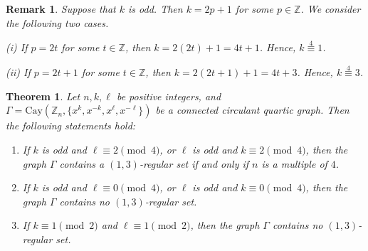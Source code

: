 \documentclass[12pt]{article}
\newtheorem{thmA}[propA]{Theorem}
\newtheorem{remA}[propA]{Remark}
\begin{document}
 \begin{remA}\label{rem:odd}
 	Suppose that $k$ is odd. Then $k=2p+1$ for some $p\in\mathbb{Z}$. We consider the following two cases.
 	
 	\textup{(i)} If $p=2t$ for some $t\in\mathbb{Z}$, then $k=2(2t)+1=4t+1$. Hence, $k\stackrel{4}{\equiv}1$.
 	
 	\textup{(ii)} If $p=2t+1$ for some $t\in\mathbb{Z}$, then $k=2(2t+1)+1=4t+3$. Hence, $k\stackrel{4}{\equiv}3$.
 \end{remA}
  \begin{thmA}\label{thm:13}
  	Let $n, k, \ell$ be positive integers, and $\Gamma = \mathrm{Cay}(\mathbb{Z}_n, \{x^k, x^{-k}, x^\ell, x^{-\ell}\})$ be a connected circulant quartic graph. Then the following statements hold:
  	\begin{enumerate}
  		\item[(i)] If $k$ is odd and \(\ell \equiv 2 \pmod{4}\), or $\ell$ is odd and \(k \equiv 2 \pmod{4}\), then the graph \(\Gamma\) contains a \((1,3)\)-regular set if and only if \(n\) is a multiple of \(4\).
  		\item[(ii)] If $k$ is odd and \(\ell \equiv 0 \pmod{4}\), or $\ell$ is odd and \(k \equiv 0 \pmod{4}\), then the graph \(\Gamma\) contains no \((1,3)\)-regular set.
  		\item[(iii)] If \(k \equiv 1 \pmod{2}\) and \(\ell \equiv 1 \pmod{2}\), then the graph \(\Gamma\) contains no \((1,3)\)-regular set.
  	\end{enumerate}
  \end{thmA}
\end{document}
